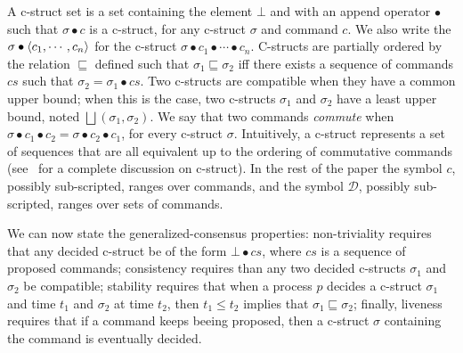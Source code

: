 A c-struct set is a set containing the element $\bot$ and with an append operator $\bullet$ such that $\sigma \bullet c$ is a c-struct, for any c-struct $\sigma$ and command $c$. 
We also write the $\sigma\bullet\left\langle c_1,\cdots,c_n\right\rangle$ for the c-struct $\sigma\bullet c_1\bullet\cdots\bullet c_n$.
C-structs are partially ordered by the relation $\sqsubseteq$ defined such that $\sigma_1\sqsubseteq\sigma_2$ iff there exists a sequence of commands $cs$ such that $\sigma_2=\sigma_1\bullet cs$. Two c-structs are compatible when they have a common upper bound; when this is the case, two c-structs $\sigma_1$ and $\sigma_2$ have a least upper bound, noted $\bigsqcup\left( \sigma_1,\sigma_2 \right)$.
We say that two commands \textit{commute} when $\sigma\bullet c_1\bullet c_2 =  \sigma\bullet c_2\bullet c_1 $, for every c-struct $\sigma$. Intuitively, a c-struct represents a set of sequences that are all equivalent up to the ordering of commutative commands (see~\cite{Lamport05GeneralizeConsensus} for a complete discussion on c-struct). 
In the rest of the paper the symbol $c$, possibly sub-scripted, ranges over commands, and the symbol $\mathcal{D}$, possibly sub-scripted, ranges over sets of commands.

We can now state the generalized-consensus properties: non-triviality requires that any decided c-struct be of the form $\bot\bullet cs$, where $cs$ is a sequence of proposed commands; consistency requires than any two decided c-structs $\sigma_1$ and $\sigma_2$ be compatible; stability requires that when a process $p$ decides a c-struct $\sigma_1$ and time $t_1$ and $\sigma_2$ at time $t_2$, then $t_1 \leq t_2$ implies that $\sigma_1\sqsubseteq \sigma_2$; finally, liveness requires that
if a command keeps beeing proposed, then a c-struct $\sigma$ containing the command is eventually decided.



